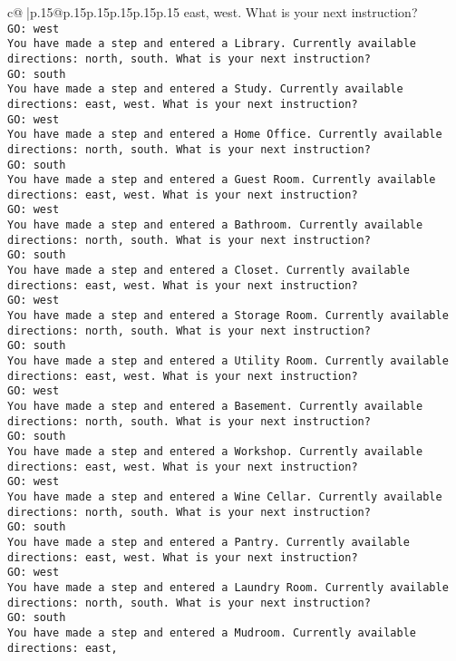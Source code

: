 \documentclass{article}
\begin{document}
{\begin{supertabular}{c@{$\;$}|p{.15\linewidth}@{}p{.15\linewidth}p{.15\linewidth}p{.15\linewidth}p{.15\linewidth}p{.15\linewidth}}
{{{east, west. What is your next instruction?\\ \tt GO: west\\ \tt You have made a step and entered a Library. Currently available directions: north, south. What is your next instruction?\\ \tt GO: south\\ \tt You have made a step and entered a Study. Currently available directions: east, west. What is your next instruction?\\ \tt GO: west\\ \tt You have made a step and entered a Home Office. Currently available directions: north, south. What is your next instruction?\\ \tt GO: south\\ \tt You have made a step and entered a Guest Room. Currently available directions: east, west. What is your next instruction?\\ \tt GO: west\\ \tt You have made a step and entered a Bathroom. Currently available directions: north, south. What is your next instruction?\\ \tt GO: south\\ \tt You have made a step and entered a Closet. Currently available directions: east, west. What is your next instruction?\\ \tt GO: west\\ \tt You have made a step and entered a Storage Room. Currently available directions: north, south. What is your next instruction?\\ \tt GO: south\\ \tt You have made a step and entered a Utility Room. Currently available directions: east, west. What is your next instruction?\\ \tt GO: west\\ \tt You have made a step and entered a Basement. Currently available directions: north, south. What is your next instruction?\\ \tt GO: south\\ \tt You have made a step and entered a Workshop. Currently available directions: east, west. What is your next instruction?\\ \tt GO: west\\ \tt You have made a step and entered a Wine Cellar. Currently available directions: north, south. What is your next instruction?\\ \tt GO: south\\ \tt You have made a step and entered a Pantry. Currently available directions: east, west. What is your next instruction?\\ \tt GO: west\\ \tt You have made a step and entered a Laundry Room. Currently available directions: north, south. What is your next instruction?\\ \tt GO: south\\ \tt You have made a step and entered a Mudroom. Currently available directions: east, }}}
\end{supertabular}}
\end{document}
